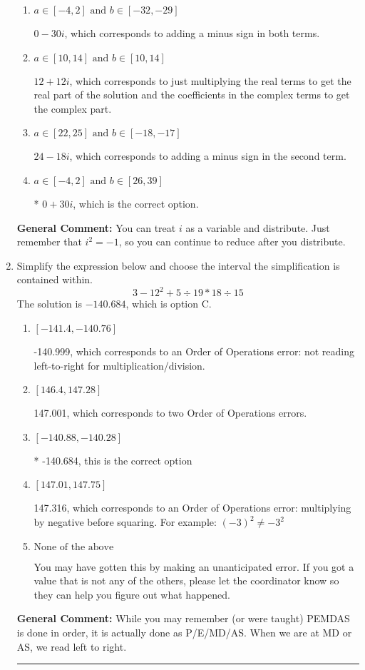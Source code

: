 \documentclass{extbook}[14pt]
\newcommand{\litem}[1]{\item #1

\rule{\textwidth}{0.4pt}}
\begin{document}
\begin{enumerate}
{\begin{enumerate}[label=\Alph*.]
 $24 + 18 i$, which corresponds to adding a minus sign in the first term.
\item \( a \in [-4, 2] \text{ and } b \in [-32, -29] \)

 $0 - 30 i$, which corresponds to adding a minus sign in both terms.
\item \( a \in [10, 14] \text{ and } b \in [10, 14] \)

 $12 + 12 i$, which corresponds to just multiplying the real terms to get the real part of the solution and the coefficients in the complex terms to get the complex part.
\item \( a \in [22, 25] \text{ and } b \in [-18, -17] \)

 $24 - 18 i$, which corresponds to adding a minus sign in the second term.
\item \( a \in [-4, 2] \text{ and } b \in [26, 39] \)

* $0 + 30 i$, which is the correct option.
\end{enumerate}

\textbf{General Comment:} You can treat $i$ as a variable and distribute. Just remember that $i^2=-1$, so you can continue to reduce after you distribute.
}
\litem{
Simplify the expression below and choose the interval the simplification is contained within.
\[ 3 - 12^2 + 5 \div 19 * 18 \div 15 \]The solution is \( -140.684 \), which is option C.\begin{enumerate}[label=\Alph*.]
\item \( [-141.4, -140.76] \)

 -140.999, which corresponds to an Order of Operations error: not reading left-to-right for multiplication/division.
\item \( [146.4, 147.28] \)

 147.001, which corresponds to two Order of Operations errors.
\item \( [-140.88, -140.28] \)

* -140.684, this is the correct option
\item \( [147.01, 147.75] \)

 147.316, which corresponds to an Order of Operations error: multiplying by negative before squaring. For example: $(-3)^2 \neq -3^2$
\item \( \text{None of the above} \)

 You may have gotten this by making an unanticipated error. If you got a value that is not any of the others, please let the coordinator know so they can help you figure out what happened.
\end{enumerate}

\textbf{General Comment:} While you may remember (or were taught) PEMDAS is done in order, it is actually done as P/E/MD/AS. When we are at MD or AS, we read left to right.
}
\end{enumerate}
\end{document}
